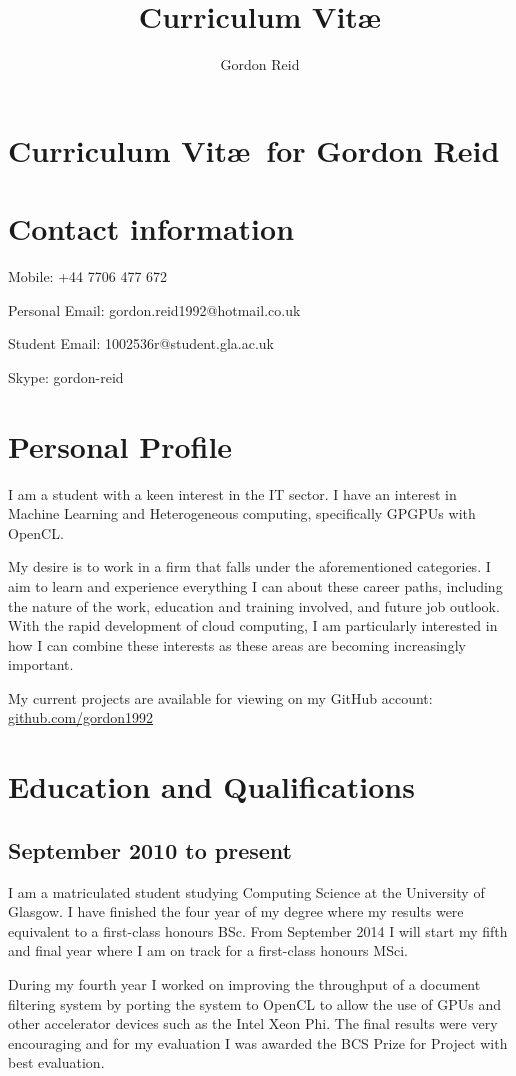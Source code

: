 \documentclass[11pt,a4paper]{article}
\title{Curriculum Vit\ae}
\author{Gordon Reid}
\begin{document}
\section*{Curriculum Vit\ae\ for Gordon Reid}
\section*{Contact information}
Mobile: +44 7706 477 672

Personal Email: gordon.reid1992@hotmail.co.uk

Student Email: 1002536r@student.gla.ac.uk

Skype: gordon-reid

\section*{Personal Profile}

I am a student with a keen interest in the IT sector. I have an interest in
Machine Learning and Heterogeneous computing, specifically GPGPUs with OpenCL.

My desire is to work in a firm that falls under the aforementioned categories. I
aim to learn and experience everything I can about these career paths, including
the nature of the work, education and training involved, and future job outlook.
With the rapid development of cloud computing, I am particularly interested in
how I can combine these interests as these areas are becoming increasingly
important.

My current projects are available for viewing on my GitHub account:
\url{github.com/gordon1992}

\section*{Education and Qualifications}

\subsection*{September 2010 to present}

I am a matriculated student studying Computing Science at the University of
Glasgow. I have finished the four year of my degree where my results were
equivalent to a first-class honours BSc. From September 2014 I will start my
fifth and final year where I am on track for a first-class honours MSci.

During my fourth year I worked on improving the throughput of a document
filtering system by porting the system to OpenCL to allow the use of GPUs and
other accelerator devices such as the Intel Xeon Phi. The final results were
very encouraging and for my evaluation I was awarded the BCS Prize for Project
with best evaluation.
\end{document}
